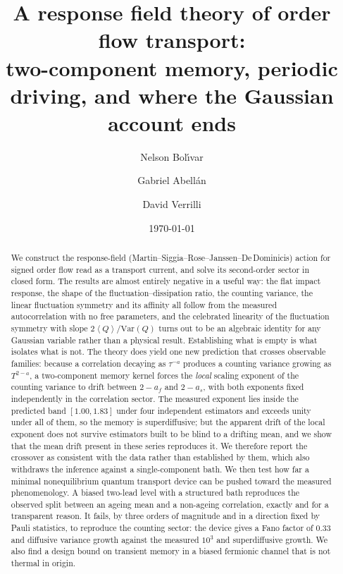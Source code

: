\documentclass[aps,pre,twocolumn,superscriptaddress,floatfix,nofootinbib]{revtex4-2}
\newcommand{\avg}[1]{\left\langle #1 \right\rangle}
\newcommand{\Var}{\mathrm{Var}}
\begin{document}
\title{A response field theory of order flow transport:\\
two-component memory, periodic driving, and where the Gaussian account ends}

\author{Nelson Bol\'{\i}var}
\author{Gabriel Abell\'an}
\author{David Verrilli}

\date{\today}

\begin{abstract}
We construct the response-field (Martin--Siggia--Rose--Janssen--De\,Dominicis)
action for signed order flow read as a transport current, and solve its
second-order sector in closed form. The results are almost entirely negative in
a useful way: the flat impact response, the shape of the
fluctuation--dissipation ratio, the counting variance, the linear fluctuation
symmetry and its affinity all follow from the measured autocorrelation with no
free parameters, and the celebrated linearity of the fluctuation symmetry with
slope $2\avg{Q}/\Var(Q)$ turns out to be an algebraic identity for any Gaussian
variable rather than a physical result. Establishing what is empty is what
isolates what is not. The theory does yield one new prediction that crosses
observable families: because a correlation decaying as $\tau^{-a}$ produces a
counting variance growing as $T^{2-a}$, a two-component memory kernel forces
the \emph{local} scaling exponent of the counting variance to drift between
$2-a_f$ and $2-a_s$, with both exponents fixed independently in the correlation
sector. The measured exponent lies inside the predicted band $[1.00,1.83]$
under four independent estimators and exceeds unity under all of them, so the
memory is superdiffusive; but the apparent drift of the local exponent does not
survive estimators built to be blind to a drifting mean, and we show that the
mean drift present in these series reproduces it. We therefore report the
crossover as consistent with the data rather than established by them, which
also withdraws the inference against a single-component bath. We then test how
far a minimal nonequilibrium quantum transport device can be pushed toward the
measured phenomenology. A biased two-lead level with a structured bath
reproduces the observed split between an ageing mean and a non-ageing
correlation, exactly and for a transparent reason. It fails, by three orders of
magnitude and in a direction fixed by Pauli statistics, to reproduce the
counting sector: the device gives a Fano factor of $0.33$ and diffusive variance
growth against the measured $10^3$ and superdiffusive growth. We also find a
design bound on transient memory in a biased fermionic channel that is not
thermal in origin.
\end{abstract}
\end{document}
